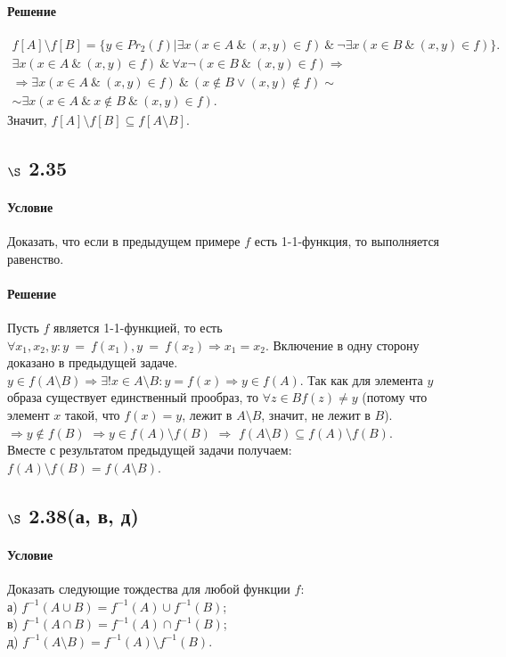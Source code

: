 \documentclass[a4paper,12pt]{article}
\begin{document}
\paragraph*{Решение}
\begin{gather*}
f[A]\setminus f[B] = \{y\in Pr_2(f)|\exists x(x\in A\ \& \ (x,y)\in f)\ \& \ \neg \exists x( x\in B \ \& \ (x,y)\in f)\}.\\
\exists x(x\in A\ \& \ (x,y)\in f)\ \& \ \forall x \neg ( x\in B \ \& \ (x,y)\in f) \Rightarrow \\ \Rightarrow \exists x(x\in A\ \& \ (x,y)\in f)\ \& \  ( x\notin B \vee (x,y)\notin f) \sim \\
\sim \exists x (x\in A \ \& \ x\notin B \ \& \ (x,y)\in f).
\end{gather*}
Значит, $f[A]\setminus f[B] \subseteq f[A\setminus B]$.

\subsection*{$\S$ 2.35}
\paragraph*{Условие}
Доказать, что если в предыдущем примере $f$ есть 1-1-функция, то выполняется равенство.
\paragraph*{Решение}
Пусть $f$ является 1-1-функцией, то есть $\forall x_1,x_2,y: y~=~f(x_1), y~=~f(x_2) \Rightarrow x_1=x_2$. Включение в одну сторону доказано в предыдущей задаче. \\
$y\in f(A\setminus B) \Rightarrow \exists ! x\in A\setminus B: y=f(x) \Rightarrow y\in f(A)$. Так как для  элемента $y$ образа существует единственный прообраз, то $\forall z\in B f(z)\ne y$ (потому что элемент $x$ такой, что $f(x)=y$, лежит в $A\setminus B$, значит, не лежит в $B$). $\Rightarrow y\notin f(B)$ $\Rightarrow y\in f(A)\setminus f(B)$ $\Rightarrow$ $f(A\setminus B) \subseteq f(A)\setminus f(B)$.\\
Вместе с результатом предыдущей задачи получаем:\\
 $f(A)\setminus f(B) = f(A\setminus B)$.
 
\subsection*{$\S$ 2.38(а, в, д)}
\paragraph*{Условие}
Доказать следующие тождества для любой функции $f$:\\
а) $f^{-1} (A\cup B) = f^{-1} (A) \cup f^{-1} (B)$; \\
в) $f^{-1} (A\cap B) = f^{-1} (A) \cap f^{-1} (B)$; \\
д) $f^{-1} (A\setminus B) = f^{-1} (A)\setminus f^{-1}(B)$.
\end{document}
